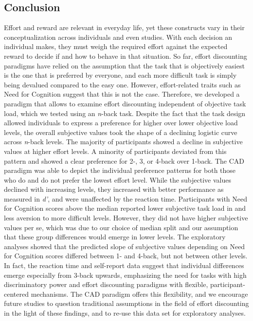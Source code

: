 \documentclass[
  man,floatsintext]{apa6}
\begin{document}
\hypertarget{conclusion}{%
\subsection{Conclusion}\label{conclusion}}

Effort and reward are relevant in everyday life, yet these constructs vary in their conceptualization across individuals and even studies.
With each decision an individual makes, they must weigh the required effort against the expected reward to decide if and how to behave in that situation.
So far, effort discounting paradigms have relied on the assumption that the task that is objectively easiest is the one that is preferred by everyone, and each more difficult task is simply being devalued compared to the easy one.
However, effort-related traits such as Need for Cognition suggest that this is not the case.
Therefore, we developed a paradigm that allows to examine effort discounting independent of objective task load, which we tested using an \emph{n}-back task.
Despite the fact that the task design allowed individuals to express a preference for higher over lower objective load levels, the overall subjective values took the shape of a declining logistic curve across \emph{n}-back levels.
The majority of participants showed a decline in subjective values at higher effort levels.
A minority of participants deviated from this pattern and showed a clear preference for 2-, 3, or 4-back over 1-back.
The CAD paradigm was able to depict the individual preference patterns for both those who do and do not prefer the lowest effort level.
While the subjective values declined with increasing levels, they increased with better performance as measured in \emph{d'}, and were unaffected by the reaction time.
Participants with Need for Cognition scores above the median reported lower subjective task load in and less aversion to more difficult levels.
However, they did not have higher subjective values per se, which was due to our choice of median split and our assumption that these group differences would emerge in lower levels.
The exploratory analyses showed that the predicted slope of subjective values depending on Need for Cognition scores differed between 1- and 4-back, but not between other levels.
In fact, the reaction time and self-report data suggest that individual differences emerge especially from 3-back upwards, emphasizing the need for tasks with high discriminatory power and effort discounting paradigms with flexible, participant-centered mechanisms.
The CAD paradigm offers this flexibility, and we encourage future studies to question traditional assumptions in the field of effort discounting in the light of these findings, and to re-use this data set for exploratory analyses.
\end{document}
